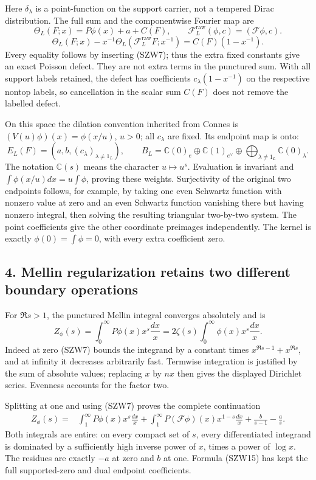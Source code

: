 \documentclass[
  10pt,
  a4paper,
]{article}
\begin{document}
Here \(\delta_\lambda\) is a point-function on the support carrier, not
a tempered Dirac distribution. The full sum and the componentwise
Fourier map are \[
\Theta_L(F;x)=P\phi(x)+a+C(F),\qquad
\mathcal F_L^{\mathrm{raw}}(\phi,c)=(\mathcal F\phi,c).
\] \[
\Theta_L(F;x)-x^{-1}\Theta_L(\mathcal F_L^{\mathrm{raw}}F;x^{-1})
=C(F)(1-x^{-1}).
\tag{SZW12}
\] Every equality follows by inserting (SZW7); thus the extra fixed
constants give an exact Poisson defect. They are not extra terms in the
punctured sum. With all support labels retained, the defect has
coefficients \(c_\lambda(1-x^{-1})\) on the respective nontop labels, so
cancellation in the scalar sum \(C(F)\) does not remove the labelled
defect.

On this space the dilation convention inherited from Connes is
\((V(u)\phi)(x)=\phi(x/u)\), \(u>0\); all \(c_\lambda\) are fixed. Its
endpoint map is onto: \[
E_L(F)=\left(a,b,(c_\lambda)_{\lambda\ne1_L}\right),\qquad
B_L=\mathbb C(0)_{e}\oplus\mathbb C(1)_{e^\vee}
\oplus\bigoplus_{\lambda\ne1_L}\mathbb C(0)_\lambda.
\tag{SZW13}
\] The notation \(\mathbb C(s)\) means the character \(u\mapsto u^s\).
Evaluation is invariant and \(\int\phi(x/u)dx=u\int\phi\), proving these
weights. Surjectivity of the original two endpoints follows, for
example, by taking one even Schwartz function with nonzero value at zero
and an even Schwartz function vanishing there but having nonzero
integral, then solving the resulting triangular two-by-two system. The
point coefficients give the other coordinate preimages independently.
The kernel is exactly \(\phi(0)=\int\phi=0\), with every extra
coefficient zero.

\subsection{4. Mellin regularization retains two different boundary
operations}\label{mellin-regularization-retains-two-different-boundary-operations}

For \(\Re s>1\), the punctured Mellin integral converges absolutely and
is \[
Z_\phi(s)=\int_0^\infty P\phi(x)x^s\frac{dx}{x}
=2\zeta(s)\int_0^\infty\phi(x)x^s\frac{dx}{x}.
\tag{SZW14}
\] Indeed at zero (SZW7) bounds the integrand by a constant times
\(x^{\Re s-1}+x^{\Re s}\), and at infinity it decreases arbitrarily
fast. Termwise integration is justified by the sum of absolute values;
replacing \(x\) by \(nx\) then gives the displayed Dirichlet series.
Evenness accounts for the factor two.

Splitting at one and using (SZW7) proves the complete continuation \[
\begin{aligned}
Z_\phi(s)={}&\int_1^\infty P\phi(x)x^s\frac{dx}{x}
+\int_1^\infty P(\mathcal F\phi)(x)x^{1-s}\frac{dx}{x}
+\frac{b}{s-1}-\frac{a}{s}.
\end{aligned}
\tag{SZW15}
\] Both integrals are entire: on every compact set of \(s\), every
differentiated integrand is dominated by a sufficiently high inverse
power of \(x\), times a power of \(\log x\). The residues are exactly
\(-a\) at zero and \(b\) at one. Formula (SZW15) has kept the full
supported-zero and dual endpoint coefficients.
\end{document}
